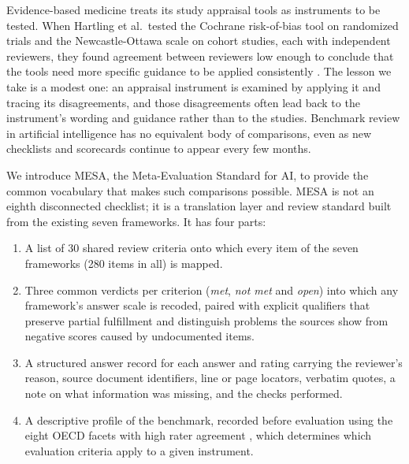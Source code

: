 \documentclass[10pt,conference]{IEEEtran}
\begin{document}
Evidence-based medicine treats its study appraisal tools as instruments to be tested. When Hartling et al.\ tested the Cochrane risk-of-bias tool on randomized trials and the Newcastle-Ottawa scale on cohort studies, each with independent reviewers, they found agreement between reviewers low enough to conclude that the tools need more specific guidance to be applied consistently \cite{hartling_rand_2012}. The lesson we take is a modest one: an appraisal instrument is examined by applying it and tracing its disagreements, and those disagreements often lead back to the instrument's wording and guidance rather than to the studies. Benchmark review in artificial intelligence has no equivalent body of comparisons, even as new checklists and scorecards continue to appear every few months.

We introduce MESA, the Meta-Evaluation Standard for AI, to provide the common vocabulary that makes such comparisons possible. MESA is not an eighth disconnected checklist; it is a translation layer and review standard built from the existing seven frameworks. It has four parts:
\begin{enumerate}
\item A list of 30 shared review criteria onto which every item of the seven frameworks (280 items in all) is mapped.
\item Three common verdicts per criterion (\emph{met}, \emph{not met} and \emph{open}) into which any framework's answer scale is recoded, paired with explicit qualifiers that preserve partial fulfillment and distinguish problems the sources show from negative scores caused by undocumented items.
\item A structured answer record for each answer and rating carrying the reviewer's reason, source document identifiers, line or page locators, verbatim quotes, a note on what information was missing, and the checks performed.
\item A descriptive profile of the benchmark, recorded before evaluation using the eight OECD facets with high rater agreement \cite{cohn_hernandez_orallo_oecd_2023}, which determines which evaluation criteria apply to a given instrument.
\end{enumerate}
\end{document}
